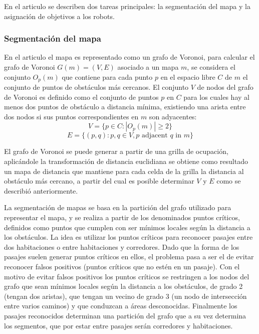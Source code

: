 En el articulo se describen dos tareas principales: la segmentación del mapa y la asignación de objetivos a los robots.

\subsubsection{Segmentación del mapa}
En el articulo el mapa es representado como un grafo de Voronoi, para calcular el grafo de Voronoi $G(m) = (V, E)$ asociado a un mapa $m$, se considera el conjunto $O_p (m)$ que contiene para cada punto $p$ en el espacio libre $C$ de $m$ el conjunto de puntos de obstáculos más cercanos. El conjunto $V$ de nodos del grafo de Voronoi es definido como el conjunto de puntos $p$ en $C$ para los cuales hay al menos dos puntos de obstáculo a distancia mínima, existiendo una arista entre dos nodos si sus puntos correspondientes en $m$ son adyacentes:
\[
V = \{p \in C : |O_p (m)| \geq 2\}
\]
\[
E = \{(p, q) : p, q \in V, p \text{ adjacent } q \text{ in } m\}
\]

El grafo de Voronoi se puede generar a partir de una grilla de ocupación, aplicándole la transformación de distancia euclidiana\cite{meijster2002general} se obtiene como resultado un mapa de distancia que mantiene para cada celda de la grilla la distancia al obstáculo más cercano, a partir del cual es posible determinar $V$ y $E$ como se describió anteriormente.

La segmentación de mapas se basa en la partición del grafo utilizado para representar el mapa, y se realiza a partir de los denominados puntos críticos, definidos como puntos que cumplen con ser mínimos locales según la distancia a los obstáculos. La idea es utilizar los puntos críticos para reconocer pasajes entre dos habitaciones o entre habitaciones y corredores. Dado que la forma de los pasajes suelen generar puntos críticos en ellos, el problema pasa a ser el de evitar reconocer falsos positivos (puntos críticos que no estén en un pasaje). Con el motivo de evitar falsos positivos los puntos críticos se restringen a los nodos del grafo que sean mínimos locales según la distancia a los obstáculos, de grado 2 (tengan dos aristas), que tengan un vecino de grado 3 (un nodo de intersección entre varios caminos) y que conduzcan a áreas desconocidas.
Finalmente los pasajes reconocidos determinan una partición del grafo que a su vez determina los segmentos, que por estar entre pasajes serán corredores y habitaciones.

